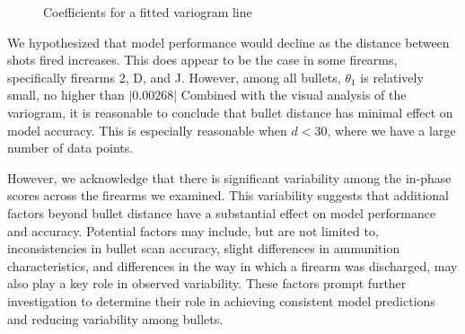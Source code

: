 \documentclass[
  12pt]{article}
\begin{document}
\begin{figure}[H]


\caption{\label{fig-variogramCoefficients}Coefficients for a fitted
variogram line}

\end{figure}%

We hypothesized that model performance would decline as the distance
between shots fired increases. This does appear to be the case in some
firearms, specifically firearms 2, D, and J. However, among all bullets,
\(\theta_1\) is relatively small, no higher than \(|0.00268|\) Combined
with the visual analysis of the variogram, it is reasonable to conclude
that bullet distance has minimal effect on model accuracy. This is
especially reasonable when \(d < 30\), where we have a large number of
data points.

However, we acknowledge that there is significant variability among the
in-phase scores across the firearms we examined. This variability
suggests that additional factors beyond bullet distance have a
substantial effect on model performance and accuracy. Potential factors
may include, but are not limited to, inconsistencies in bullet scan
accuracy, slight differences in ammunition characteristics, and
differences in the way in which a firearm was discharged, may also play
a key role in observed variability. These factors prompt further
investigation to determine their role in achieving consistent model
predictions and reducing variability among bullets.
\end{document}
